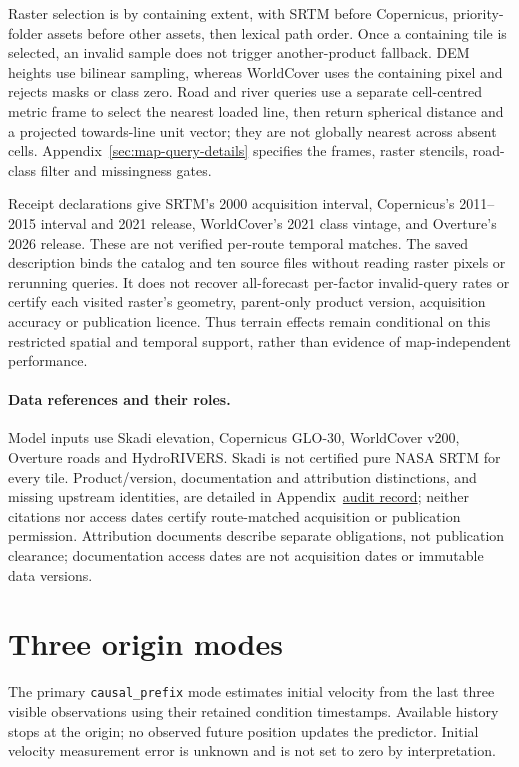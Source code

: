 Raster selection is by containing extent, with SRTM before Copernicus,
priority-folder assets before other assets, then lexical path order.
Once a containing tile is selected, an invalid sample does not trigger
another-product fallback. DEM heights use bilinear sampling, whereas
WorldCover uses the containing pixel and rejects masks or class zero.
Road and river queries use a separate cell-centred metric frame to select
the nearest loaded line, then return spherical distance and a projected
towards-line unit vector; they are not globally nearest across absent cells.
Appendix~\ref{sec:map-query-details} specifies the frames, raster stencils,
road-class filter and missingness gates.

Receipt declarations give SRTM's 2000 acquisition interval, Copernicus's
2011--2015 interval and 2021 release, WorldCover's 2021 class vintage, and
Overture's 2026 release. These are not verified per-route temporal matches.
The saved description binds the catalog and ten source files without reading
raster pixels or rerunning queries. It does not recover all-forecast
per-factor invalid-query rates or certify each visited raster's geometry,
parent-only product version, acquisition accuracy or publication licence.
Thus terrain effects remain conditional on this restricted spatial and
temporal support, rather than evidence of map-independent performance.

\paragraph{Data references and their roles.}
\label{sec:data-reference-roles}\hypertarget{sec:data-reference-roles}{}
Model inputs use Skadi elevation\cite{mapzenterrain}, Copernicus GLO-30\cite{copernicusdem2021},
WorldCover v200\cite{worldcover2021}, Overture roads\cite{overture202608}
and HydroRIVERS\cite{hydrorivers2013}. Skadi is not certified pure NASA SRTM
for every tile. Product/version, documentation and attribution distinctions,
and missing upstream identities, are detailed in
Appendix~\href{audit-notes.pdf\#sec:source-reconciliation-details}{audit record}; neither citations nor
access dates certify route-matched acquisition or publication permission.
Attribution documents\cite{mapzenattribution,overtureattribution,hydroriverslicense}
describe separate obligations, not publication clearance; documentation access
dates are not acquisition dates or immutable data versions.


\section{Three origin modes}
The primary \texttt{causal\_prefix} mode estimates initial velocity from the
last three visible observations using their retained condition timestamps.
Available history stops at the origin; no observed future position updates
the predictor. Initial velocity measurement error is unknown and is not set
to zero by interpretation.

